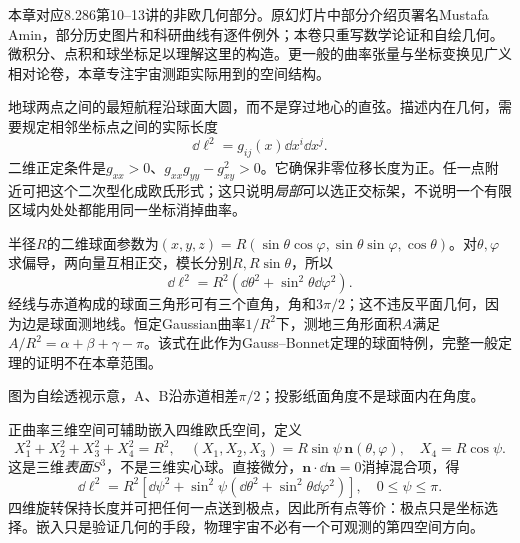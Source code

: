 本章对应8.286第10--13讲的非欧几何部分。原幻灯片中部分介绍页署名Mustafa Amin，部分历史图片和科研曲线有逐件例外；本卷只重写数学论证和自绘几何。微积分、点积和球坐标足以理解这里的构造。更一般的曲率张量与坐标变换见广义相对论卷，本章专注宇宙测距实际用到的空间结构。

地球两点之间的最短航程沿球面大圆，而不是穿过地心的直弦。描述内在几何，需要规定相邻坐标点之间的实际长度
\[
 \dd\ell^2=g_{ij}(x)\dd x^i\dd x^j.
\]
二维正定条件是$g_{xx}>0$、$g_{xx}g_{yy}-g_{xy}^2>0$。它确保非零位移长度为正。任一点附近可把这个二次型化成欧氏形式；这只说明\emph{局部}可以选正交标架，不说明一个有限区域内处处都能用同一坐标消掉曲率。

半径$R$的二维球面参数为$(x,y,z)=R(\sin\theta\cos\varphi,\sin\theta\sin\varphi,\cos\theta)$。对$\theta,\varphi$求偏导，两向量互相正交，模长分别$R,R\sin\theta$，所以
\[
 \dd\ell^2=R^2(\dd\theta^2+\sin^2\theta\dd\varphi^2).
\]
经线与赤道构成的球面三角形可有三个直角，角和$3\pi/2$；这不违反平面几何，因为边是球面测地线。恒定Gaussian曲率$1/R^2$下，测地三角形面积$A$满足$A/R^2=\alpha+\beta+\gamma-\pi$。该式在此作为Gauss--Bonnet定理的球面特例，完整一般定理的证明不在本章范围。

\begin{center}\end{center}
图为自绘透视示意，A、B沿赤道相差$\pi/2$；投影纸面角度不是球面内在角度。

正曲率三维空间可辅助嵌入四维欧氏空间，定义
\[
 X_1^2+X_2^2+X_3^2+X_4^2=R^2,\quad
 (X_1,X_2,X_3)=R\sin\psi\,\mathbf n(\theta,\varphi),\quad X_4=R\cos\psi.
\]
这是三维\emph{表面}$S^3$，不是三维实心球。直接微分，$\mathbf n\cdot\dd\mathbf n=0$消掉混合项，得
\[
 \dd\ell^2=R^2[\dd\psi^2+\sin^2\psi(\dd\theta^2+\sin^2\theta\dd\varphi^2)],\quad0\leq\psi\leq\pi.
\]
四维旋转保持长度并可把任何一点送到极点，因此所有点等价：极点只是坐标选择。嵌入只是验证几何的手段，物理宇宙不必有一个可观测的第四空间方向。

